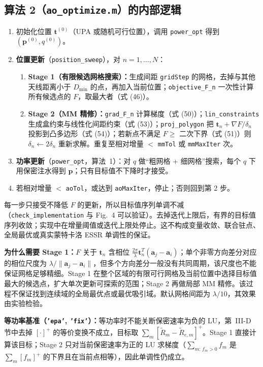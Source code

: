 \documentclass[11pt,a4paper]{ctexart}
\newcommand{\code}[1]{\texttt{#1}}
\newcommand{\bt}{\mathbf t}
\begin{document}
\subsection{算法 2（\code{ao\_optimize.m}）的内部逻辑}
\begin{enumerate}
\item 初始化位置 $\bt^{(0)}$（UPA 或随机可行位置），调用 \code{power\_opt} 得到 $(\mathbf p^{(0)},q^{(0)})$。
\item \textbf{位置更新}（\code{position\_sweep}），对 $n=1,\dots,N$：
  \begin{enumerate}
  \item \textbf{Stage 1（有限候选网格搜索）：}生成间距 \code{gridStep} 的网格，去掉与其他天线距离小于 $D_{\min}$ 的点，再加入当前位置；\code{objective\_F\_n} 一次性计算所有候选点的 $F$，取最大者（式 (46)）。
  \item \textbf{Stage 2（MM 精修）：}\code{grad\_F\_n} 计算梯度（式 (50)）；\code{lin\_constraints} 生成盒约束与线性化间距约束（式 (53)）；\code{proj\_polygon} 把 $\bt_n+\nabla F/\delta_n$ 投影到凸多边形（式 (54)）；若新点不满足 $F\ge$ 二次下界（式 (51)）则 $\delta_n\leftarrow2\delta_n$ 重新求解。重复至相对增量 $<$ \code{mmTol} 或 \code{mmMaxIter} 次。
  \end{enumerate}
\item \textbf{功率更新}（\code{power\_opt}，算法~1）：对 $q$ 做“粗网格 + 细网格”搜索，每个 $q$ 下用保密注水得到 $\mathbf p$；只有目标值不下降时才接受。
\item 若相对增量 $<$ \code{aoTol}，或达到 \code{aoMaxIter}，停止；否则回到第 2 步。
\end{enumerate}
每一步只接受不降低 $F$ 的更新，所以目标值序列单调不减（\code{check\_implementation} 与 Fig.~4 可以验证）。去掉迭代上限后，有界的目标值序列收敛；实现中在增量阈值或迭代上限处停止。这不构成变量收敛、联合驻点、全局最优或真实蒙特卡洛 ESSR 单调性的保证。

\textbf{为什么需要 Stage 1：}$F$ 关于 $\bt_n$ 含相位 $\frac{2\pi}{\lambda}\bt_n^T(\mathbf a_j-\mathbf a_i)$；单个非零方向差分对应的相位尺度为 $\lambda/\|\mathbf a_j-\mathbf a_i\|$，但多个方向差分一般没有共同周期，该尺度也不能保证网格足够精细。Stage 1 在整个区域的有限可行网格及当前位置中选择目标值最大的候选点，扩大单次更新可探索的范围；Stage 2 再做局部 MM 精修。该过程不保证找到连续域的全局最优点或最优吸引域。默认网格间距为 $\lambda/10$，其效果由实验检验。

\textbf{等功率基准（\code{'epa'}, \code{'fix'}）：}等功率时不能关断保密速率为负的 LU，第~III-D 节中去掉 $[\cdot]^+$ 的等价变换不成立，目标取 $\sum_m[\tilde R_m-\tilde R_{e,m}]^+$。Stage 1 直接计算该目标；Stage 2 只对当前保密速率为正的 LU 求梯度（$\sum_{m:\,f_m>0}f_m$ 是 $\sum_m[f_m]^+$ 的下界且在当前点相等），因此单调性仍成立。
\end{document}
